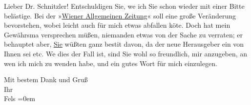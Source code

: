 \pstart{}Lieber Dr. Schnitzler!\pend\vspace{0.5em}
\pstart
           Entschuldigen Sie, we{\geminationn} ich Sie schon wieder mit einer
               Bitte belästige. Bei der »\uline{Wiener Allgemeinen Zeitung}« soll eine große Veränderung bevorstehen, wobei leicht auch für mich etwas abfallen kö{\geminationn}te. Doch
               hat mein Gewährsma{\geminationn} versprechen müßen, niemanden etwas
               von der Sache zu verraten; er behauptet aber, \uline{Sie}
               wüßten ganz besti{\geminationm}t davon, da der neue Herausgeber ein \label{K_L00379-1v}\label{K_L00379-1}
               von Ihnen sei etc. We{\geminationn} dies der Fall ist, sind Sie wohl
               so freundlich, mir anzugeben, an wen ich mich zu wenden habe, und ein gutes Wort für
               mich einzulegen.\pend
           
\pstart
           Mit bestem Dank und Gruß{\\[\baselineskip]}Ihr{\\[\baselineskip]}\spacefill\mbox{Fels}\pend
           \leftskip=0em{}\endnumbering{}  \newcommand{\dateiname}{L00379}\newcommand{\titel}{Friedrich M. Fels an Arthur Schnitzler, 7. 10. 1894}\newcommand{\editorInnen}{Martin Anton Müller und Gerd-Hermann Susen}
